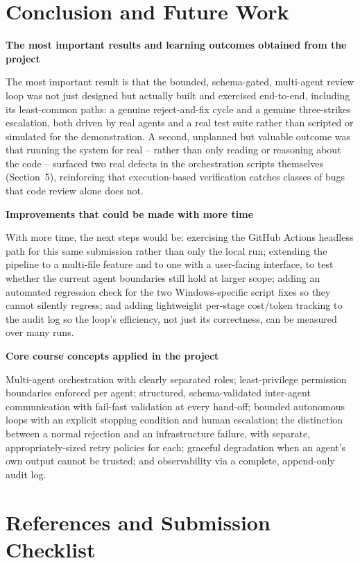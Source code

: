 \documentclass[11pt,a4paper]{article}
\newcommand{\answerarea}[2]{\textbf{#1}\par\begin{answerbox}#2\end{answerbox}}
\begin{document}
\section{Conclusion and Future Work}

\answerarea{The most important results and learning outcomes obtained from the project}{
The most important result is that the bounded, schema-gated, multi-agent review loop was
not just designed but actually built and exercised end-to-end, including its least-common
paths: a genuine reject-and-fix cycle and a genuine three-strikes escalation, both driven by
real agents and a real test suite rather than scripted or simulated for the demonstration.
A second, unplanned but valuable outcome was that running the system for real -- rather than
only reading or reasoning about the code -- surfaced two real defects in the orchestration
scripts themselves (Section~5), reinforcing that execution-based verification catches classes
of bugs that code review alone does not.
}

\answerarea{Improvements that could be made with more time}{
With more time, the next steps would be: exercising the GitHub Actions headless path for
this same submission rather than only the local run; extending the pipeline to a multi-file
feature and to one with a user-facing interface, to test whether the current agent
boundaries still hold at larger scope; adding an automated regression check for the two
Windows-specific script fixes so they cannot silently regress; and adding lightweight
per-stage cost/token tracking to the audit log so the loop's efficiency, not just its
correctness, can be measured over many runs.
}

\answerarea{Core course concepts applied in the project}{
Multi-agent orchestration with clearly separated roles; least-privilege permission
boundaries enforced per agent; structured, schema-validated inter-agent communication with
fail-fast validation at every hand-off; bounded autonomous loops with an explicit stopping
condition and human escalation; the distinction between a normal rejection and an
infrastructure failure, with separate, appropriately-sized retry policies for each;
graceful degradation when an agent's own output cannot be trusted; and observability via a
complete, append-only audit log.
}

\section{References and Submission Checklist}
\end{document}
